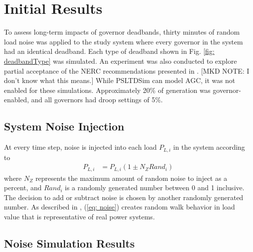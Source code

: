 \section{Initial Results}
To assess long-term impacts of governor deadbands, thirty minutes of random load noise was applied to the study system where every governor in the system had an identical deadband.
Each type of deadband shown in Fig. \ref{fig: deadbandType} was simulated.
An experiment was also conducted to explore partial acceptance of the NERC recommendations presented in \cite{nercFRI2012}. [MKD NOTE: I don't know what this means.]
While PSLTDSim can model AGC, it was not enabled for these simulations. Approximately 20\% of generation was governor-enabled, and all governors had droop settings of 5\%.



\subsection{System Noise Injection}
At every time step, noise is injected into each load $P_{L,i}$ in the system according to
\begin{align}
P_{L,i} &= P_{L,i}(1 \pm N_Z Rand_i) \label{eq: noise}
\end{align}
where $N_Z$ represents the maximum amount of random noise to inject as a percent,
and $Rand_i$ is a randomly generated number between 0 and 1 inclusive.
The decision to add or subtract noise is chosen by another randomly generated number.
As described in \cite{AGCCresap}, (\ref{eq: noise}) creates random walk behavior in load value that is representative of real power systems.


\subsection{Noise Simulation Results}

